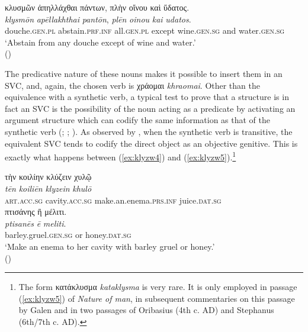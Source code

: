 \documentclass[output=paper,colorlinks,citecolor=brown]{langscibook}
\begin{document}
\begin{exe}
\ex\label{ex:klyzw3}
\glll κλυσμῶν ἀπηλλάχθαι πάντων, πλὴν οἴνου καὶ ὕδατος. \\ 
\textit{klysmōn} \textit{apēllakhthai} \textit{pantōn}, \textit{plēn} \textit{oinou} \textit{kai} \textit{udatos}. \\
douche.\textsc{gen.pl} abstain.\textsc{prf.inf} all.\textsc{gen.pl} except wine.\textsc{gen.sg} and water.\textsc{gen.sg} \\
\glt ‘Abstain from any douche except of wine and water.' \\
\hspace*{\fill}()
\end{exe}

The predicative nature of these nouns makes it possible to insert them in an SVC, and, again, the chosen verb is χράομαι \textit{khraomai}. Other than the equivalence with a synthetic verb, a typical test to prove that a structure is in fact an SVC is the possibility of the noun acting as a predicate by activating an argument structure which can codify the same information as that of the synthetic verb (\citealt[345--346]{Gross2004}; \citealt[181--182]{langer2004linguistic}; \citealt{JiménezLópez2011,JiménezLópez2012}). As observed by \citet{JiménezLópez2012}, when the synthetic verb is transitive, the equivalent SVC tends to codify the direct object as an objective genitive. This is exactly what happens between (\ref{ex:klyzw4}) and (\ref{ex:klyzw5}).\footnote{The form κατάκλυσμα \textit{kataklysma} is very rare. It is only employed in passage (\ref{ex:klyzw5}) of \textit{Nature of man}, in subsequent commentaries on this passage by Galen and in two passages of Oribasius (4th c. AD) and Stephanus (6th/7th c. AD).}


\begin{exe}
\ex\label{ex:klyzw4}
\glll τὴν κοιλίην κλύζειν χυλῷ \\ 
\textit{tēn} \textit{koiliēn} \textit{klyzein} \textit{khulō}  \\
\textsc{art.acc.sg} cavity.\textsc{acc.sg} make.an.enema.\textsc{prs.inf} juice.\textsc{dat.sg}  \\

\glll πτισάνης ἢ μέλιτι.  \\
\textit{ptisanēs} \textit{ē} \textit{meliti}. \\
barley.gruel.\textsc{gen.sg} or honey.\textsc{dat.sg} \\
\glt ‘Make an enema to her cavity with barley gruel or honey.' \\
\hspace*{\fill}()
\end{exe}
\end{document}
